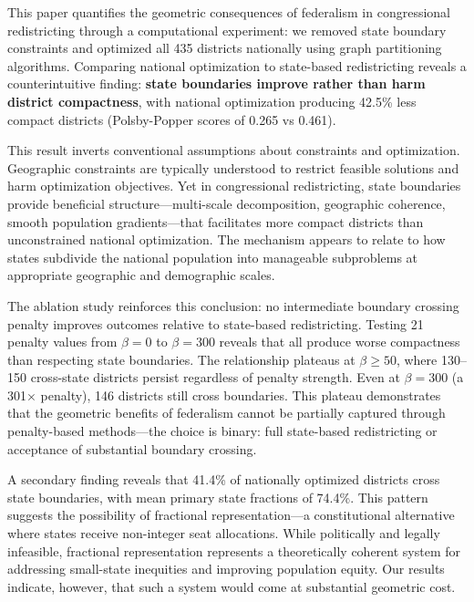 
This paper quantifies the geometric consequences of federalism in congressional redistricting through a computational experiment: we removed state boundary constraints and optimized all 435 districts nationally using graph partitioning algorithms. Comparing national optimization to state-based redistricting reveals a counterintuitive finding: \textbf{state boundaries improve rather than harm district compactness}, with national optimization producing 42.5\% less compact districts (Polsby-Popper scores of 0.265 vs 0.461).

This result inverts conventional assumptions about constraints and optimization. Geographic constraints are typically understood to restrict feasible solutions and harm optimization objectives. Yet in congressional redistricting, state boundaries provide beneficial structure---multi-scale decomposition, geographic coherence, smooth population gradients---that facilitates more compact districts than unconstrained national optimization. The mechanism appears to relate to how states subdivide the national population into manageable subproblems at appropriate geographic and demographic scales.

The ablation study reinforces this conclusion: no intermediate boundary crossing penalty improves outcomes relative to state-based redistricting. Testing 21 penalty values from $ \beta = 0 $ to $ \beta = 300 $ reveals that all produce worse compactness than respecting state boundaries. The relationship plateaus at $ \beta \geq 50 $, where 130--150 cross-state districts persist regardless of penalty strength. Even at $ \beta = 300 $ (a 301$\times$ penalty), 146 districts still cross boundaries. This plateau demonstrates that the geometric benefits of federalism cannot be partially captured through penalty-based methods---the choice is binary: full state-based redistricting or acceptance of substantial boundary crossing.

A secondary finding reveals that 41.4\% of nationally optimized districts cross state boundaries, with mean primary state fractions of 74.4\%. This pattern suggests the possibility of fractional representation---a constitutional alternative where states receive non-integer seat allocations. While politically and legally infeasible, fractional representation represents a theoretically coherent system for addressing small-state inequities and improving population equity. Our results indicate, however, that such a system would come at substantial geometric cost.

